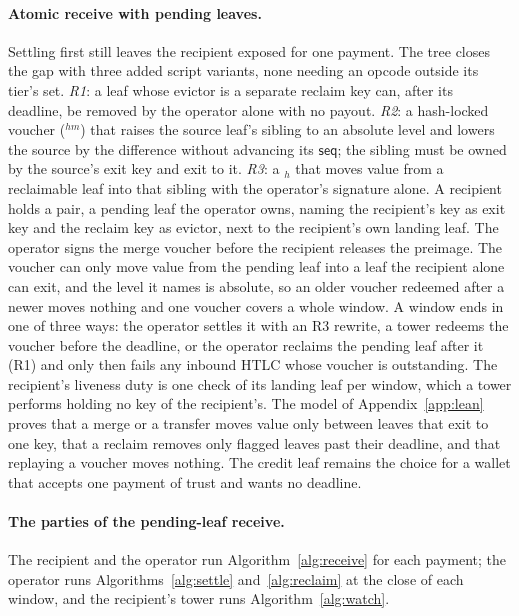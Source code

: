 \paragraph{Atomic receive with pending leaves.}\label{sec:pending}
Settling first still leaves the recipient exposed for one payment. The
tree closes the gap with three added script variants, none needing an
opcode outside its tier's set. \emph{R1}: a leaf whose evictor is a
separate reclaim key can, after its deadline, be removed by the operator
alone with no payout. \emph{R2}: a hash-locked voucher ($^{hm}$)
that raises the source leaf's sibling to an absolute level and lowers the
source by the difference without advancing its $\mathsf{seq}$; the
sibling must be owned by the source's exit key and exit to it. \emph{R3}:
a $_h$ that moves value from a reclaimable leaf into that
sibling with the operator's signature alone. A recipient holds a pair, a
pending leaf the operator owns, naming the recipient's key as exit key
and the reclaim key as evictor, next to the recipient's own landing leaf.
The operator signs the merge voucher before the recipient releases the
preimage. The voucher can only move value from the pending leaf into a
leaf the recipient alone can exit, and the level it names is absolute, so
an older voucher redeemed after a newer moves nothing and one voucher
covers a whole window. A window ends in one of three ways: the operator
settles it with an R3 rewrite, a tower redeems the voucher before the
deadline, or the operator reclaims the pending leaf after it (R1) and
only then fails any inbound HTLC whose voucher is outstanding. The
recipient's liveness duty is one check of its landing leaf per window,
which a tower performs holding no key of the recipient's. The model of
Appendix~\ref{app:lean} proves that a merge or a transfer moves value only
between leaves that exit to one key, that a reclaim removes only flagged
leaves past their deadline, and that replaying a voucher moves nothing. The
credit leaf remains the choice for a wallet that accepts one payment of
trust and wants no deadline.

\paragraph{The parties of the pending-leaf receive.} The recipient and the
operator run Algorithm~\ref{alg:receive} for each payment; the operator runs
Algorithms~\ref{alg:settle} and~\ref{alg:reclaim} at the close of each
window, and the recipient's tower runs Algorithm~\ref{alg:watch}.

\algReceive
\algSettle
\algWatch
\algReclaim
